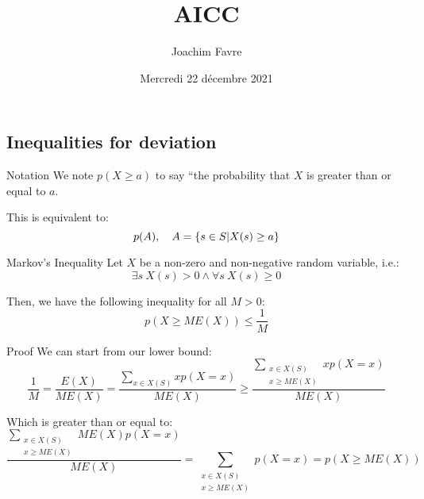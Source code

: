 \documentclass[a4paper]{article}
\title{AICC}
\author{Joachim Favre}
\date{Mercredi 22 décembre 2021}
\begin{document}
\maketitle


\subsection{Inequalities for deviation}
\begin{parag}{Notation}
    We note $p\left(X \geq a\right)$ to say ``the probability that $X$ is greater than or equal to $a$.

    This is equivalent to: 
    \[p\left(A\right), \mathspace A = \left\{s \in S | X\left(s\right) \geq a\right\}\]
\end{parag}


\begin{parag}{Markov's Inequality}
    Let $X$ be a non-zero and non-negative random variable, i.e.: 
    \[\exists s\ X\left(s\right) > 0 \land \forall s\ X\left(s\right) \geq 0\]
    
    Then, we have the following inequality for all $M > 0$: 
    \[p\left(X \geq M E\left(X\right)\right) \leq \frac{1}{M}\]

    \begin{subparag}{Proof}
        We can start from our lower bound: 
        \[\frac{1}{M} = \frac{E\left(X\right)}{ME\left(X\right)} = \frac{\sum\limits_{x \in X\left(S\right)}^{} xp\left(X = x\right)}{ME\left(X\right)} \geq \frac{\sum\limits_{\substack{x \in X\left(S\right) \\ x \geq ME\left(X\right)}}^{} xp\left(X = x\right)}{ME\left(X\right)}\]

        Which is greater than or equal to:
        \[\frac{\sum\limits_{\substack{x \in X\left(S\right) \\ x \geq ME\left(X\right)}}^{} ME\left(X\right)p\left(X = x\right)}{ME\left(X\right)} = \sum_{\substack{x \in X\left(S\right) \\ x \geq ME\left(X\right)}}^{} p\left(X = x\right) = p\left(X \geq M E\left(X\right)\right)\]
    \end{subparag}
    
\end{parag}
\end{document}
